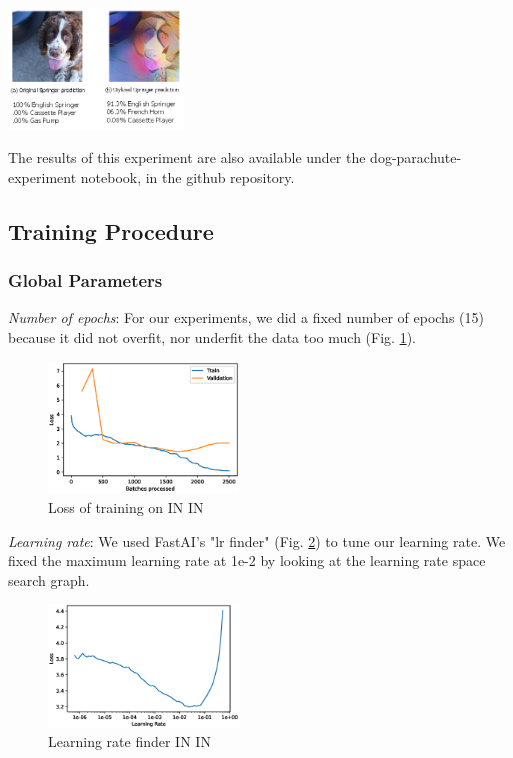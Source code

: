 \documentclass{article}
\begin{document}
\begin{center}
  \captionsetup{type=figure}
  \includegraphics[width=0.35\textwidth]{imgs/experiment-1/stylized-imagenette-160-dog-predictions}
  \label{stylized-imagenette-160-dog-predictions}
\end{center}

\noindent
The results of this experiment are also available under the dog-parachute-experiment notebook, 
in the github repository.

\newpage
\subsection{Training Procedure}


\subsubsection{Global Parameters}

\textit{Number of epochs}: For our experiments, we did a fixed number of epochs
 (15) because it did not overfit, nor underfit the data too much (Fig. \ref{loss_in}).

 \begin{figure}[h!]
  \includegraphics[width = 0.45\textwidth]{imgs/sin/loss}
  \caption{Loss of training on IN \texorpdfstring{\textrightarrow} .IN}
  \label{loss_in}
\end{figure}

\textit{Learning rate}: We used FastAI's "lr finder" (Fig. \ref{lr_finder}) to tune our learning rate.
We fixed the maximum learning rate at 1e-2 by looking at the learning rate space search graph.
\begin{figure}[h!]
  \includegraphics[width = 0.45\textwidth]{imgs/lr_find.eps}
  \caption{Learning rate finder IN \texorpdfstring{\textrightarrow} .IN}
  \label{lr_finder}
\end{figure}
\end{document}
